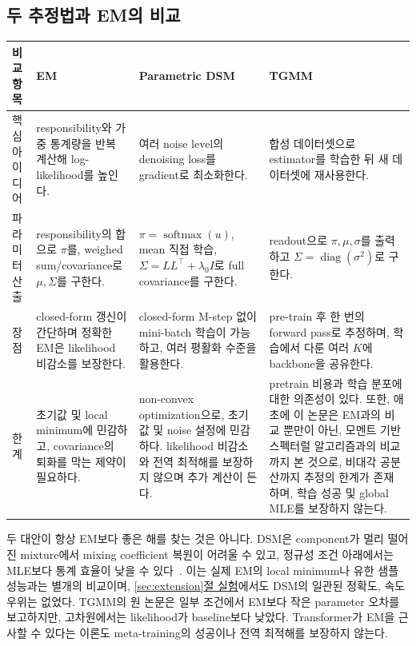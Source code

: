 \documentclass[a4paper,11pt]{article}
\DeclareRobustCommand{\seclink}[3]{\hyperref[#2]{\ref*{#1}#3}\hspace{0pt}}
\DeclareRobustCommand{\secref}[2]{\seclink{#1}{#1}{#2}}
\newcommand{\diag}{\operatorname{diag}}
\newcommand{\softmax}{\operatorname{softmax}}
\numberwithin{equation}{section}
\begin{document}
\subsection{두 추정법과 EM의 비교}
\begin{center}\begin{minipage}{\linewidth}\centering
{}
\label{tab:comparison}
\small
\setlength{\tabcolsep}{4pt}
\renewcommand{\arraystretch}{1.15}
\begin{tabularx}{\linewidth}{@{}>{\raggedright\arraybackslash}p{1.55cm}YYY@{}}
\toprule
비교 항목 & EM & Parametric DSM & TGMM \\
\midrule
핵심 아이디어 &
responsibility와 가중 통계량을 반복 계산해 log-likelihood를 높인다. &
여러 noise level의 denoising loss를 gradient로 최소화한다. &
합성 데이터셋으로 estimator를 학습한 뒤 새 데이터셋에 재사용한다. \\
\addlinespace
파라미터 산출 &
responsibility의 합으로 $\pi$를, weighed sum/covariance로 $\mu,\Sigma$를 구한다. &
$\pi=\softmax(u)$, mean 직접 학습, $\Sigma=LL^\top+\lambda_0I$로 full covariance를 구한다. &
readout으로 $\pi,\mu,\sigma$를 출력하고 $\Sigma=\diag(\sigma^2)$로 구한다. \\
\addlinespace
장점 &
closed-form 갱신이 간단하며 정확한 EM은 likelihood 비감소를 보장한다. &
closed-form M-step 없이 mini-batch 학습이 가능하고, 여러 평활화 수준을 활용한다. &
pre-train 후 한 번의 forward pass로 추정하며, 학습에서 다룬 여러 $K$에 backbone을 공유한다. \\
\addlinespace
한계 &
초기값 및 local minimum에 민감하고, covariance의 퇴화를 막는 제약이 필요하다. &
non-convex optimization으로, 초기값 및 noise 설정에 민감하다. likelihood 비감소와 전역 최적해를 보장하지 않으며 추가 계산이 든다. &
pretrain 비용과 학습 분포에 대한 의존성이 있다. 또한, 애초에 이 논문은 EM과의 비교 뿐만이 아닌, 모멘트 기반 스펙터럴 알고리즘과의 비교까지 본 것으로, 비대각 공분산까지 추정의 한계가 존재하며, 학습 성공 및 global MLE를 보장하지 않는다. \\
\bottomrule
\end{tabularx}
\end{minipage}\end{center}

두 대안이 항상 EM보다 좋은 해를 찾는 것은 아니다.
DSM은 component가 멀리 떨어진 mixture에서 mixing coefficient 복원이 어려울 수 있고,
정규성 조건 아래에서는 MLE보다 통계 효율이 낮을 수 있다~\citep{koehler2023}.
이는 실제 EM의 local minimum나 유한 샘플 성능과는 별개의 비교이며,
\secref{sec:extension}{절 실험}에서도 DSM의 일관된 정확도, 속도 우위는 없었다.
TGMM의 원 논문은 일부 조건에서 EM보다 작은 parameter 오차를 보고하지만,
고차원에서는 likelihood가 baseline보다 낮았다.
Transformer가 EM을 근사할 수 있다는 이론도 meta-training의 성공이나 전역 최적해를 보장하지 않는다.
\end{document}
